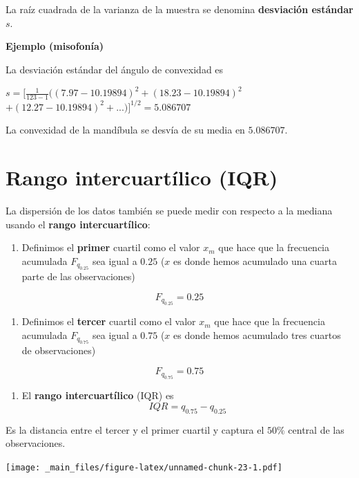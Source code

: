 \documentclass[
]{book}
\providecommand{\tightlist}{%
  \setlength{\itemsep}{0pt}\setlength{\parskip}{0pt}}
\begin{document}
La raíz cuadrada de la varianza de la muestra se denomina \textbf{desviación estándar} \(s\).

\textbf{Ejemplo (misofonía)}

La desviación estándar del ángulo de convexidad es

\(s= [\frac{1}{123-1}((7.97-10.19894)^2+ (18.23-10.19894)^2\)
\(+ (12.27-10.19894)^2 + ...)]^{1/2} = 5.086707\)

La convexidad de la mandíbula se desvía de su media en \(5.086707\).

\hypertarget{rango-intercuartuxedlico-iqr}{%
\section{Rango intercuartílico (IQR)}\label{rango-intercuartuxedlico-iqr}}

La dispersión de los datos también se puede medir con respecto a la mediana usando el \textbf{rango intercuartílico}:

\begin{enumerate}
\def\labelenumi{\arabic{enumi})}
\tightlist
\item
  Definimos el \textbf{primer} cuartil como el valor \(x_m\) que hace que la frecuencia acumulada \(F_{q_{0.25}}\) sea igual a \(0.25\) (\(x\) es donde hemos acumulado una cuarta parte de las observaciones)
\end{enumerate}

\[F_{q_{0.25}}=0.25\]

\begin{enumerate}
\def\labelenumi{\arabic{enumi})}
\setcounter{enumi}{1}
\tightlist
\item
  Definimos el \textbf{tercer} cuartil como el valor \(x_m\) que hace que la frecuencia acumulada \(F_{q_{0.75}}\) sea igual a \(0.75\) (\(x\) es donde hemos acumulado tres cuartos de observaciones)
\end{enumerate}

\[F_{q_{0.75}}=0.75\]

\begin{enumerate}
\def\labelenumi{\arabic{enumi})}
\setcounter{enumi}{2}
\tightlist
\item
  El \textbf{rango intercuartílico} (IQR) es \[IQR=q_{0.75} - q_{0.25}\]
\end{enumerate}

Es la distancia entre el tercer y el primer cuartil y captura el \(50\%\) central de las observaciones.

\texttt{[image: \_main\_files/figure-latex/unnamed-chunk-23-1.pdf]}
\end{document}
